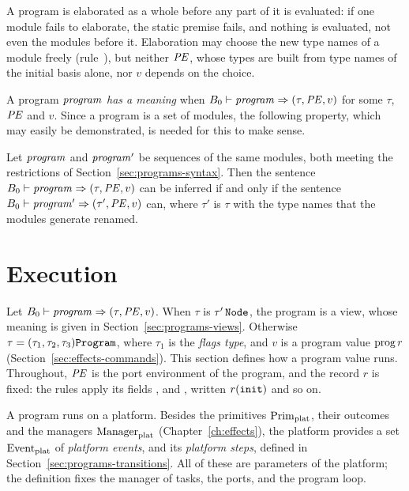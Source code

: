 
  {}

\begin{rulecomments}
 A program is elaborated as a whole before any part of
it is evaluated: if one module fails to elaborate, the static premise fails,
and nothing is evaluated, not even the modules before it. Elaboration may
choose the new type names of a module freely (rule~), but
neither $\mathit{PE}$, whose types are built from type names of the initial basis
alone, nor $v$ depends on the choice.
\end{rulecomments}

A program $\mathit{program}$ \emph{has a meaning} when
$B_0 \vdash \mathit{program} \Rightarrow (\tau,\mathit{PE},v)$ for some $\tau$, $\mathit{PE}$ and $v$. Since a
program is a set of modules, the following property, which may easily be
demonstrated, is needed for this to make sense.
\begin{property}
Let $\mathit{program}$ and $\mathit{program}'$ be sequences of the same modules, both meeting
the restrictions of Section~\ref{sec:programs-syntax}. Then the sentence
$B_0 \vdash \mathit{program} \Rightarrow (\tau,\mathit{PE},v)$ can be inferred if and only if the
sentence $B_0 \vdash \mathit{program}' \Rightarrow (\tau',\mathit{PE},v)$ can, where $\tau'$ is $\tau$
with the type names that the modules generate renamed.
\end{property}

\section{Execution}\label{sec:programs-execution}

Let $B_0 \vdash \mathit{program} \Rightarrow (\tau,\mathit{PE},v)$. When $\tau$ is $\tau'\,\mathtt{Node}$, the
program is a view, whose meaning is given in
Section~\ref{sec:programs-views}. Otherwise
$\tau=(\tau_1,\tau_2,\tau_3)\mathtt{Program}$, where $\tau_1$ is the \emph{flags
type}, and $v$ is a program value $\mathrm{prog}\,r$
(Section~\ref{sec:effects-commands}). This section defines how a program
value runs. Throughout, $\mathit{PE}$ is the port environment of the program, and the
record $r$ is fixed: the rules apply its fields ,  and
, written $r(\textnormal{\texttt{init}})$ and so on.

A program runs on a platform. Besides the primitives $\mathrm{Prim}_{\mathrm{plat}}$, their
outcomes and the managers $\mathrm{Manager}_{\mathrm{plat}}$ (Chapter~\ref{ch:effects}), the
platform provides a set $\mathrm{Event}_{\mathrm{plat}}$ of \emph{platform events}, and its
\emph{platform steps}, defined in Section~\ref{sec:programs-transitions}. All
of these are parameters of the platform; the definition fixes the manager of
tasks, the ports, and the program loop. %

